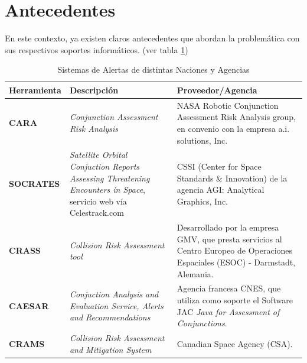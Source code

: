 \section{Antecedentes}
En este contexto, ya existen claros antecedentes que abordan la problem\'atica con sus respectivos soportes inform\'aticos. (ver tabla \ref{tab:sisal})
\begin{table}[!h]
\centering
\begin{tabular}{|l|p{5cm}|p{6cm}|}
\hline
Herramienta & Descripci\'on & Proveedor/Agencia\\
\hline
{\bf{CARA}} & {\it{Conjunction Assessment Risk Analysis}} & NASA Robotic Conjunction Assessment Risk Analysis group, en convenio con la empresa a.i. solutions, Inc.\\
\hline
{\bf{SOCRATES}} & {\it{Satellite Orbital Conjuction Reports Assessing Threatening Encounters in Space}}, servicio web v\'ia Celestrack.com & CSSI (Center for Space Standards \& Innovation) de la agencia AGI: Analytical Graphics, Inc.\\
\hline
{\bf{CRASS}} & {\it{Collision Risk Assessment tool}} & Desarrollado por la
empresa GMV, que presta servicios al Centro Europeo de Operaciones
Espaciales (ESOC) - Darmstadt, Alemania. \cite{alarconRodriguez}\\
\hline
{\bf{CAESAR}} & {\it{Conjuction Analysis and Evaluation Service, Alerts and Recommendations}} & Agencia francesa CNES, que utiliza como soporte el Software JAC {\it{Java for Assessment of Conjunctions}}. \cite{laporte}\\
\hline
{\bf{CRAMS}} & {\it{Collision Risk Assessment and Mitigation System}} & Canadian Space Agency (CSA). \cite{babiker}\\
\hline
\end{tabular}
\caption[Sistemas de Alerta]{Sistemas de Alertas de distintas Naciones y Agencias}
\label{tab:sisal}
\end{table}

